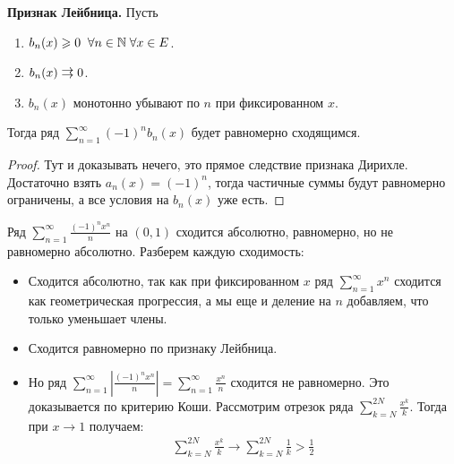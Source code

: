 \textbf{Признак Лейбница.} Пусть \begin{enumerate}
    \item $b_n(x) \geqslant 0 \;\; \forall n \in \mathbb{N} \; \forall x \in E$.
    \item $b_n(x) \doublerightarrow 0$.
    \item $b_n(x)$ монотонно убывают по $n$ при фиксированном $x$.
\end{enumerate}
Тогда ряд $\sum\limits_{n = 1}^\infty (-1)^nb_n(x)$ будет равномерно сходящимся.

\begin{proof}
    Тут и доказывать нечего, это прямое следствие признака Дирихле.
    Достаточно взять $a_n(x) = (-1)^n$, тогда частичные суммы будут равномерно ограничены, а все условия на $b_n(x)$ уже есть.
\end{proof}

\begin{example}
    Ряд $\sum\limits_{n = 1}^\infty \frac{(-1)^nx^n}{n}$ на $(0, 1)$ сходится абсолютно, равномерно, но не равномерно абсолютно.
    Разберем каждую сходимость: \begin{itemize}
        \item Сходится абсолютно, так как при фиксированном $x$ ряд $\sum\limits_{n=1}^\infty x^n$ сходится как геометрическая прогрессия, а мы еще и деление на $n$ добавляем, что только уменьшает члены.
        \item Сходится равномерно по признаку Лейбница.
        \item Но ряд $\sum\limits_{n = 1}^\infty \left|\frac{(-1)^nx^n}{n}\right| = \sum\limits_{n = 1}^\infty \frac{x^n}{n}$ сходится не равномерно.
        Это доказывается по критерию Коши. 
        Рассмотрим отрезок ряда $\sum\limits_{k = N}^{2N} \frac{x^k}{k}$.
        Тогда при $x \to 1$ получаем:
        \begin{gather*}
            \sum\limits_{k = N}^{2N} \frac{x^k}{k} \to \sum\limits_{k = N}^{2N} \frac{1}{k} > \frac{1}{2}
        \end{gather*}
    \end{itemize}
\end{example}

